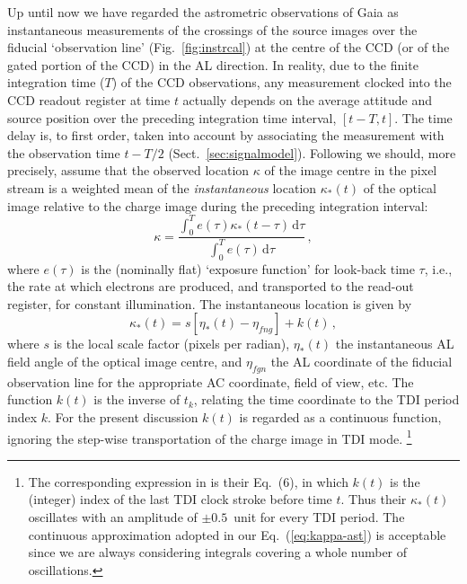 \documentclass[structabstract]{aa}
\begin{document}
Up until now we have regarded the astrometric observations of Gaia as 
instantaneous measurements of the crossings of the source images 
over the fiducial `observation line' (Fig.~\ref{fig:instrcal}) 
at the centre of the CCD (or of the gated portion of the CCD) in the AL 
direction. In reality, due to the finite integration time ($T$)  of the 
CCD observations, any measurement clocked into the
CCD readout register at time $t$ actually depends on the average attitude
and source position over the preceding integration time interval, $[t-T,t]$. The time
delay is, to first order, taken into account by associating the measurement with the
observation time $t-T/2$ (Sect.~\ref{sec:signalmodel}). 
Following \citet{2005A&A...438..745B} we should, more precisely, 
assume that the observed location $\kappa$ of the image centre in the
pixel stream is a weighted mean of the \emph{instantaneous} location 
$\kappa_*(t)$ of the optical image relative to the charge image during the
preceding integration interval:
\begin{equation}\label{eq:kappa}
\kappa = \frac{\int_0^T e(\tau)\kappa_*(t-\tau)\,\text{d}\tau}{\int_0^T e(\tau)\,\text{d}\tau}\, ,
\end{equation}
where $e(\tau)$ is the (nominally flat) `exposure function' for look-back time 
$\tau$, i.e., the rate at which electrons are produced, and transported to the
read-out register, for constant illumination. The instantaneous location is 
given by
\begin{equation}\label{eq:kappa-ast}
\kappa_*(t) =  s\left[ \eta_*(t) - \eta_{fng} \right] + k(t)  \, ,
\end{equation}
where $s$ is the local scale factor (pixels per radian), $\eta_*(t)$ the 
instantaneous AL field angle of the optical image centre, and $\eta_{fgn}$ 
the AL coordinate of the fiducial observation line for the appropriate AC 
coordinate, field of view, etc. The function $k(t)$ is the inverse of $t_k$, 
relating the time coordinate to the TDI period index $k$. For the present 
discussion $k(t)$ is regarded as a continuous function, ignoring the 
step-wise transportation of the charge image in TDI mode.%
\footnote{The corresponding expression in \citet{2005A&A...438..745B}  is
their Eq.~(6), in which $k(t)$ is the (integer) index of the last TDI clock 
stroke before time $t$. Thus their $\kappa_*(t)$ oscillates with an amplitude 
of $\pm 0.5$~unit for every TDI period. The continuous approximation 
adopted in our Eq.~(\ref{eq:kappa-ast}) is acceptable since we are always 
considering integrals covering a whole number of oscillations.}
\end{document}
